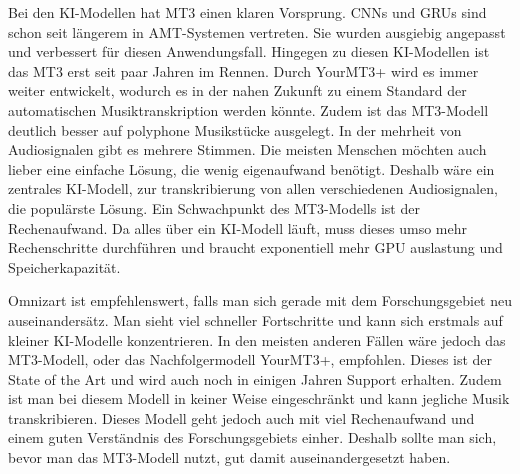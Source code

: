 Bei den KI-Modellen hat MT3 einen klaren Vorsprung.
CNNs und GRUs sind schon seit längerem in AMT-Systemen vertreten.
Sie wurden ausgiebig angepasst und verbessert für diesen Anwendungsfall.
Hingegen zu diesen KI-Modellen ist das MT3 erst seit paar Jahren im Rennen.
Durch YourMT3+ wird es immer weiter entwickelt,
wodurch es in der nahen Zukunft zu einem Standard der automatischen Musiktranskription werden könnte.
Zudem ist das MT3-Modell deutlich besser auf polyphone Musikstücke ausgelegt.
In der mehrheit von Audiosignalen gibt es mehrere Stimmen.
Die meisten Menschen möchten auch lieber eine einfache Lösung, die wenig eigenaufwand benötigt.
Deshalb wäre ein zentrales KI-Modell, zur transkribierung von allen verschiedenen Audiosignalen, die populärste Lösung.
Ein Schwachpunkt des MT3-Modells ist der Rechenaufwand.
Da alles über ein KI-Modell läuft,
muss dieses umso mehr Rechenschritte durchführen und braucht exponentiell mehr GPU auslastung und Speicherkapazität.

Omnizart ist empfehlenswert, falls man sich gerade mit dem Forschungsgebiet neu auseinandersätz.
Man sieht viel schneller Fortschritte und kann sich erstmals auf kleiner KI-Modelle konzentrieren.
In den meisten anderen Fällen wäre jedoch das MT3-Modell, oder das Nachfolgermodell YourMT3+, empfohlen.
Dieses ist der State of the Art und wird auch noch in einigen Jahren Support erhalten.
Zudem ist man bei diesem Modell in keiner Weise eingeschränkt und kann jegliche Musik transkribieren.
Dieses Modell geht jedoch auch mit viel Rechenaufwand und einem guten Verständnis des Forschungsgebiets einher.
Deshalb sollte man sich, bevor man das MT3-Modell nutzt, gut damit auseinandergesetzt haben.